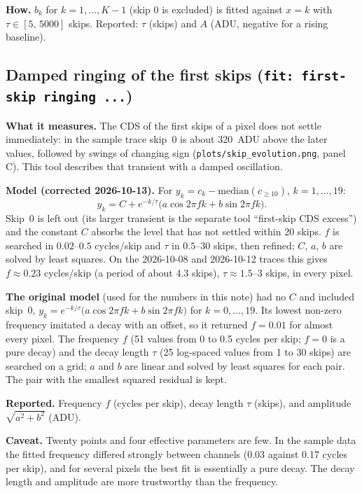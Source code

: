 \documentclass[11pt]{article}
\newcommand{\code}[1]{\texttt{#1}}
\begin{document}
\textbf{How.} $b_k$ for $k=1,\dots,K-1$ (skip 0 is excluded) is fitted against $x=k$ with
$\tau\in[5,\,5000]$ skips. Reported: $\tau$ (skips) and $A$ (ADU, negative for a rising baseline).

\subsection{Damped ringing of the first skips (\code{fit: first-skip ringing ...})}

\textbf{What it measures.} The CDS of the first skips of a pixel does not settle immediately: in the sample
trace skip~0 is about 320~ADU above the later values, followed by swings of changing sign
(\code{plots/skip\_evolution.png}, panel C). This tool describes that transient with a damped oscillation.

\textbf{Model (corrected 2026-10-13).} For $y_k = c_k - \mathrm{median}(c_{\ge 10})$, $k=1,\dots,19$:
\begin{equation}
  y_k = C + e^{-k/\tau}\bigl(a\cos 2\pi f k + b\sin 2\pi f k\bigr).
\end{equation}
Skip~0 is left out (its larger transient is the separate tool ``first-skip CDS excess'') and the constant $C$ absorbs the
level that has not settled within 20 skips. $f$ is searched in $0.02$--$0.5$ cycles/skip and $\tau$ in $0.5$--$30$ skips,
then refined; $C$, $a$, $b$ are solved by least squares. On the 2026-10-08 and 2026-10-12 traces this gives
$f \approx 0.23$ cycles/skip (a period of about 4.3 skips), $\tau \approx 1.5$--$3$ skips, in every pixel.

\textbf{The original model} (used for the numbers in this note) had no $C$ and included skip~0,
$y_k = e^{-k/\tau}\bigl(a\cos 2\pi f k + b\sin 2\pi f k\bigr)$ for $k = 0,\dots,19$. Its lowest non-zero frequency
imitated a decay with an offset, so it returned $f = 0.01$ for almost every pixel. The frequency $f$ (51 values from 0 to 0.5 cycles per skip; $f=0$ is a pure decay) and the decay length
$\tau$ (25 log-spaced values from 1 to 30 skips) are searched on a grid; $a$ and $b$ are linear and solved by
least squares for each pair. The pair with the smallest squared residual is kept.

\textbf{Reported.} Frequency $f$ (cycles per skip), decay length $\tau$ (skips), and amplitude
$\sqrt{a^2+b^2}$ (ADU).

\textbf{Caveat.} Twenty points and four effective parameters are few. In the sample data the fitted frequency
differed strongly between channels (0.03 against 0.17 cycles per skip), and for several pixels the best fit
is essentially a pure decay. The decay length and amplitude are more trustworthy than the frequency.
\end{document}
